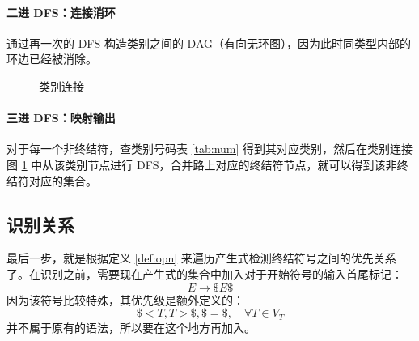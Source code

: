 \documentclass[UTF8]{article}
\begin{document}
\paragraph{二进 DFS：连接消环} 通过再一次的 DFS 构造类别之间的 DAG（有向无环图），因为此时同类型内部的环边已经被消除。

\begin{figure}[H]
    \centering
    \caption{类别连接}\label{fig:conn}
\end{figure}

\paragraph{三进 DFS：映射输出} 对于每一个非终结符，查类别号码表 \ref{tab:num} 得到其对应类别，然后在类别连接图 \ref{fig:conn} 中从该类别节点进行 DFS，合并路上对应的终结符节点，就可以得到该非终结符对应的集合。

\begin{table}[h]
    \centering
    \caption{集合}
\end{table}

\subsection{识别关系}

最后一步，就是根据定义 \ref{def:opn} 来遍历产生式检测终结符号之间的优先关系了。在识别之前，需要现在产生式的集合中加入对于开始符号的输入首尾标记：
\begin{equation*}
    E \rightarrow \$ E \$
\end{equation*}
因为该符号比较特殊，其优先级是额外定义的\cite{opgwiki}：
\begin{equation*}
    \$ < T, T > \$, \$=\$,\quad \forall T\in V_T
\end{equation*}
并不属于原有的语法，所以要在这个地方再加入。
\end{document}
